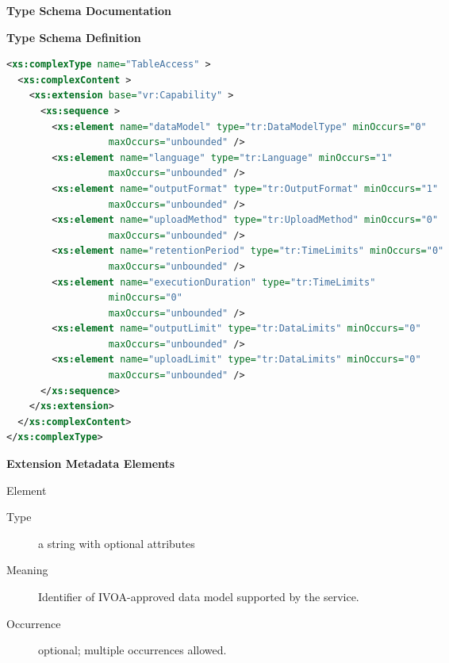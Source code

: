\documentclass{ivoa}
\begin{document}
\begin{generated}
\begingroup
        \renewcommand*\descriptionlabel[1]{%
        \hbox to 5.5em{\emph{#1}\hfil}}\vspace{2ex}\noindent\textbf{ Type Schema Documentation}



\vspace{1ex}\noindent\textbf{ Type Schema Definition}

\begin{lstlisting}[language=XML,basicstyle=\footnotesize]
<xs:complexType name="TableAccess" >
  <xs:complexContent >
    <xs:extension base="vr:Capability" >
      <xs:sequence >
        <xs:element name="dataModel" type="tr:DataModelType" minOccurs="0"
                  maxOccurs="unbounded" />
        <xs:element name="language" type="tr:Language" minOccurs="1"
                  maxOccurs="unbounded" />
        <xs:element name="outputFormat" type="tr:OutputFormat" minOccurs="1"
                  maxOccurs="unbounded" />
        <xs:element name="uploadMethod" type="tr:UploadMethod" minOccurs="0"
                  maxOccurs="unbounded" />
        <xs:element name="retentionPeriod" type="tr:TimeLimits" minOccurs="0"
                  maxOccurs="unbounded" />
        <xs:element name="executionDuration" type="tr:TimeLimits"
                  minOccurs="0"
                  maxOccurs="unbounded" />
        <xs:element name="outputLimit" type="tr:DataLimits" minOccurs="0"
                  maxOccurs="unbounded" />
        <xs:element name="uploadLimit" type="tr:DataLimits" minOccurs="0"
                  maxOccurs="unbounded" />
      </xs:sequence>
    </xs:extension>
  </xs:complexContent>
</xs:complexType>
\end{lstlisting}

\vspace{0.5ex}\noindent\textbf{ Extension Metadata Elements}

\begingroup\small\begin{bigdescription}\item[Element \xmlel{dataModel}]
\begin{description}
\item[Type] a string with optional attributes
\item[Meaning] Identifier of IVOA-approved data model supported by the
              service.
\item[Occurrence] optional; multiple occurrences allowed.


\end{description}
\end{bigdescription}
\end{generated}
\end{document}
